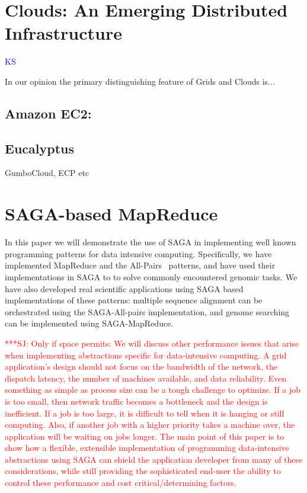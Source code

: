 \documentclass[conference,final]{IEEEtran}
\newcommand{\jhanote}[1]{ {\textcolor{red} { ***SJ: #1 }}}
\newcommand{\jhanote}[1]{}
\begin{document}
\section{Clouds: An Emerging Distributed Infrastructure}
{\textcolor{blue} {KS}}

In our opinion the primary distinguishing feature of Grids and
Clouds  is...


\subsection{Amazon EC2:} 

\subsection{Eucalyptus}


GumboCloud, ECP etc

\section{SAGA-based MapReduce}

In this paper we will demonstrate the use of SAGA in implementing well
known programming patterns for data intensive computing.
Specifically, we have implemented MapReduce and the
All-Pairs~\cite{allpairs_short} patterns, and have used their
implementations in SAGA to to solve commonly encountered genomic
tasks.  We have also developed real scientific applications using SAGA
based implementations of these patterns: multiple sequence alignment
can be orchestrated using the SAGA-All-pairs implementation, and
genome searching can be implemented using SAGA-MapReduce.

\jhanote{Only if space permits: We will discuss other performance
  issues that arise when implementing abstractions specific for
  data-intensive computing.  A grid application's design should not
  focus on the bandwidth of the network, the dispatch latency, the
  number of machines available, and data reliability.  Even something
  as simple as process size can be a tough challenge to optimize.  If
  a job is too small, then network traffic becomes a bottleneck and
  the design is inefficient.  If a job is too large, it is difficult
  to tell when it is hanging or still computing.  Also, if another job
  with a higher priority takes a machine over, the application will be
  waiting on jobs longer.  The main point of this paper is to show how
  a flexible, extensible implementation of programming data-intensive
  abstractions using SAGA can shield the application developer from
  many of these considerations, while still providing the
  sophisticated end-user the ability to control these performance and
  cost critical/determining factors.}
\end{document}
